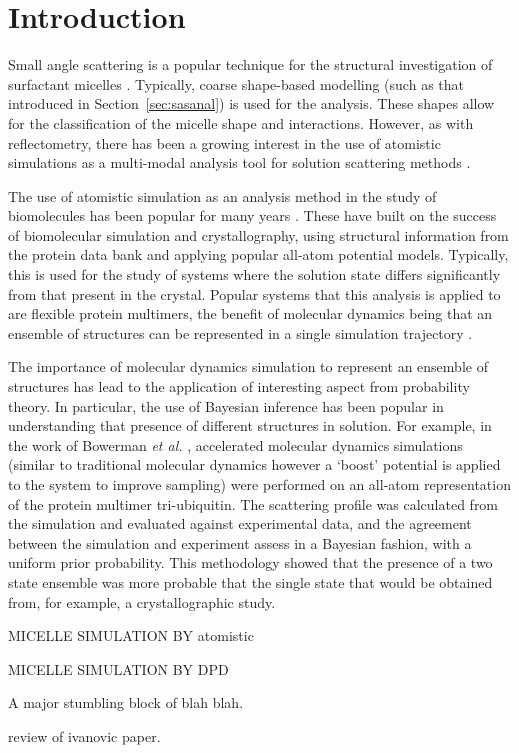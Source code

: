 \section{Introduction}

Small angle scattering is a popular technique for the structural investigation of surfactant micelles \cite{sanchez-fernandez_micellization_2016}.
Typically, coarse shape-based modelling (such as that introduced in Section~\ref{sec:sasanal}) is used for the analysis.
These shapes allow for the classification of the micelle shape and interactions.
However, as with reflectometry, there has been a growing interest in the use of atomistic simulations as a multi-modal analysis tool for solution scattering methods \cite{ivanovic_temperature-dependent_2018}.

The use of atomistic simulation as an analysis method in the study of biomolecules has been popular for many years \cite{perkins_solution_1991,mayans_demonstration_1995,hub_interpreting_2018}.
These have built on the success of biomolecular simulation and crystallography, using structural information from the protein data bank \cite{noauthor_rcsb_nodate} and applying popular all-atom potential models.
Typically, this is used for the study of systems where the solution state differs significantly from that present in the crystal.
Popular systems that this analysis is applied to are flexible protein multimers, the benefit of molecular dynamics being that an ensemble of structures can be represented in a single simulation trajectory \cite{chen_validating_2014,bowerman_determining_2017}.

The importance of molecular dynamics simulation to represent an ensemble of structures has lead to the application of interesting aspect from probability theory.
In particular, the use of Bayesian inference has been popular in understanding that presence of different structures in solution.
For example, in the work of Bowerman \emph{et al.} \cite{bowerman_determining_2017}, accelerated molecular dynamics simulations (similar to traditional molecular dynamics however a `boost' potential is applied to the system to improve sampling) were performed on an all-atom representation of the protein multimer tri-ubiquitin.
The scattering profile was calculated from the simulation and evaluated against experimental data, and the agreement between the simulation and experiment assess in a Bayesian fashion, with a uniform prior probability.
This methodology showed that the presence of a two state ensemble was more probable that the single state that would be obtained from, for example, a crystallographic study.



MICELLE SIMULATION BY atomistic

MICELLE SIMULATION BY DPD

A major stumbling block of blah blah.

review of ivanovic paper.
